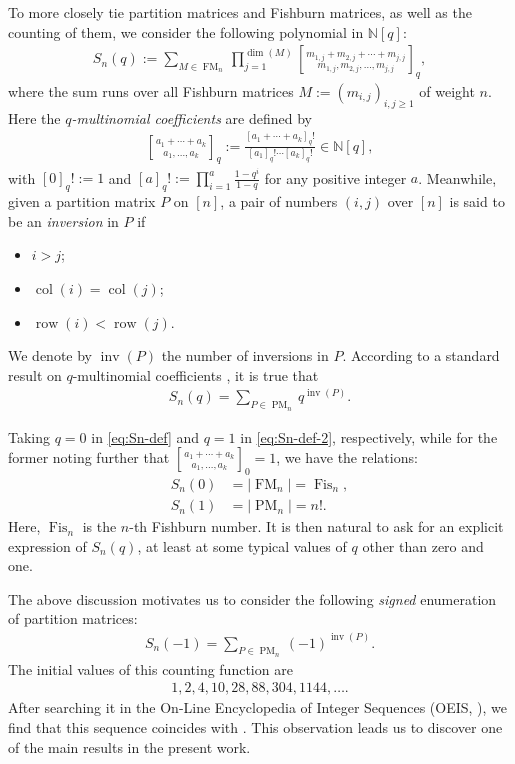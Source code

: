 \documentclass[12pt,reqno]{amsart}
\numberwithin{equation}{section}
\theoremstyle{theorem}
\theoremstyle{definition}
\theoremstyle{named}
\newcommand{\OEIS}[1]{\href{https://oeis.org/#1}{#1}}
\newcommand{\Fis}{\operatorname{Fis}}
\newcommand{\MatF}{\operatorname{FM}}
\newcommand{\MatP}{\operatorname{PM}}
\newcommand{\col}{\operatorname{col}}
\newcommand{\row}{\operatorname{row}}
\newcommand{\inv}{\operatorname{inv}}
\newcommand{\qbinom}[2]{{#1\brack #2}}
\begin{document}
To more closely tie partition matrices and Fishburn matrices, as well as the counting of them, we consider the following polynomial in $\mathbb{N}[q]$:
\begin{align}\label{eq:Sn-def}
	S_n(q) := \sum_{M\in \MatF_{n}} \prod_{j=1}^{\dim(M)} \qbinom{m_{1,j}+m_{2,j}+\cdots+m_{j,j}}{m_{1,j},m_{2,j},\ldots,m_{j,j}}_q,
\end{align}
where the sum runs over all Fishburn matrices $M:=(m_{i,j})_{i,j\ge 1}$ of weight $n$. Here the \emph{$q$-multinomial coefficients} are defined by
\begin{align*}
	\qbinom{a_1+\cdots+a_k}{a_1,\ldots,a_k}_q := \frac{[a_1+\cdots+a_k]_q!}{[a_1]_q!\cdots [a_k]_q!} \in \mathbb{N}[q],
\end{align*}
with $[0]_q!:=1$ and $[a]_q! := \prod_{i=1}^a \frac{1-q^i}{1-q}$ for any positive integer $a$. Meanwhile, given a partition matrix $P$ on $[n]$, a pair of numbers $(i,j)$ over $[n]$ is said to be an \emph{inversion} in $P$ if
\begin{itemize}[itemindent=*, leftmargin=*, itemsep=2pt, topsep=2pt, parsep=2pt]
	\item $i>j$;
	
	\item $\col(i)=\col(j)$;
	
	\item $\row(i)<\row(j)$.
\end{itemize}
We denote by $\inv(P)$ the number of inversions in $P$. According to a standard result on $q$-multinomial coefficients \cite[p.~41, Theorem~3.6]{And1998}, it is true that
\begin{align}\label{eq:Sn-def-2}
	S_n(q) = \sum_{P\in \MatP_{n}} q^{\inv(P)}.
\end{align}

Taking $q=0$ in \eqref{eq:Sn-def} and $q=1$ in \eqref{eq:Sn-def-2}, respectively, while for the former noting further that $\qbinom{a_1+\cdots+a_k}{a_1,\ldots,a_k}_0 = 1$, we have the relations:
\begin{align}
	S_n(0) &= |\MatF_{n}| = \Fis_n,\label{eq:S0}\\
	S_n(1) &= |\MatP_{n}| = n!.\label{eq:S1}
\end{align}
Here, $\Fis_n$ is the $n$-th Fishburn number. It is then natural to ask for an explicit expression of $S_n(q)$, at least at some typical values of $q$ other than zero and one.

The above discussion motivates us to consider the following \emph{signed} enumeration of partition matrices:
\begin{align}
	S_n(-1) = \sum_{P\in \MatP_{n}} (-1)^{\inv(P)}.
\end{align}
The initial values of this counting function are
\begin{align*}
	1, 2, 4, 10, 28, 88, 304, 1144, \ldots.
\end{align*}
After searching it in the On-Line Encyclopedia of Integer Sequences (OEIS, \cite{OEIS}), we find that this sequence coincides with \cite[\OEIS{A229046}]{OEIS}. This observation leads us to discover one of the main results in the present work.
\end{document}
